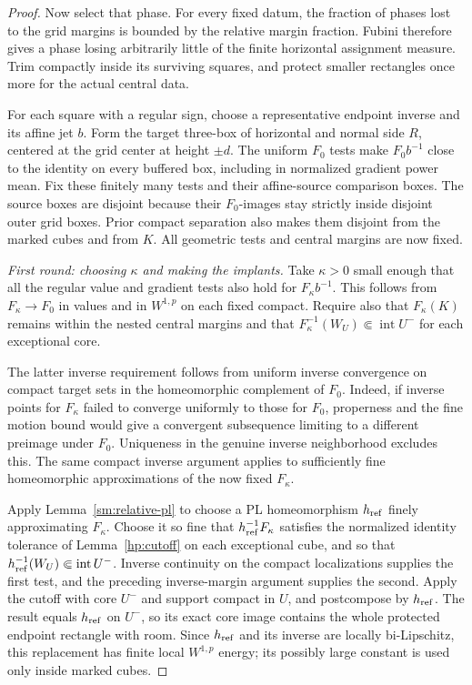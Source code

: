 \documentclass[11pt]{article}
\numberwithin{equation}{section}
\theoremstyle{definition}
\theoremstyle{remark}
\DeclareMathOperator{\interior}{int}
\begin{document}
\begin{proof}
Now select that phase.  For every fixed datum, the fraction of phases
lost to the grid margins is bounded by the relative margin fraction.
Fubini therefore gives a phase losing arbitrarily little of the finite
horizontal assignment measure.  Trim compactly inside its surviving
squares, and protect smaller rectangles once more for the actual
central data.

For each square with a regular sign, choose a representative endpoint
inverse and its affine jet $b$.  Form the target three-box of horizontal
and normal side $R$, centered at the grid center at height $\pm d$.
The uniform $F_0$ tests make $F_0b^{-1}$ close to the identity on
every buffered box, including in normalized gradient power mean.
Fix these finitely many tests and their affine-source comparison
boxes.  The source boxes are disjoint because their $F_0$-images stay
strictly inside disjoint outer grid boxes.  Prior compact separation
also makes them disjoint from the marked cubes and from $K$.
All geometric tests and central margins are now fixed.

\emph{First round: choosing $\kappa$ and making the implants.}
Take $\kappa>0$ small enough that all the regular value and gradient
tests also hold for $F_\kappa b^{-1}$.  This follows from
$F_\kappa\to F_0$ in values and in $W^{1,p}$ on each fixed compact.
Require also that $F_\kappa(K)$ remains within the nested central
margins and that $F_\kappa^{-1}(W_U)\Subset\interior U^-$ for each
exceptional core.

The latter inverse requirement follows from uniform inverse convergence
on compact target sets in the homeomorphic complement of $F_0$.
Indeed, if inverse points for $F_\kappa$ failed to converge uniformly
to those for $F_0$, properness and the fine motion bound would give a
convergent subsequence limiting to a different preimage under $F_0$.
Uniqueness in the genuine inverse neighborhood excludes this.
The same compact inverse argument applies to sufficiently fine
homeomorphic approximations of the now fixed $F_\kappa$.

Apply Lemma~\ref{sm:relative-pl} to choose a PL homeomorphism
$h_{\rm ref}$ finely approximating $F_\kappa$.  Choose it so fine
that $h_{\rm ref}^{-1}F_\kappa$ satisfies the normalized identity
tolerance of Lemma~\ref{hp:cutoff} on each exceptional cube, and so
that $h_{\rm ref}^{-1}(W_U)\Subset\interior U^-$.
Inverse continuity on the compact localizations supplies the first
test, and the preceding inverse-margin argument supplies the second.
Apply the cutoff with core $U^-$ and support compact in $U$, and
postcompose by $h_{\rm ref}$.  The result equals $h_{\rm ref}$ on
$U^-$, so its exact core image contains the whole protected endpoint
rectangle with room.  Since $h_{\rm ref}$ and its inverse are locally
bi-Lipschitz, this replacement has finite local $W^{1,p}$ energy;
its possibly large constant is used only inside marked cubes.


\end{proof}
\end{document}
